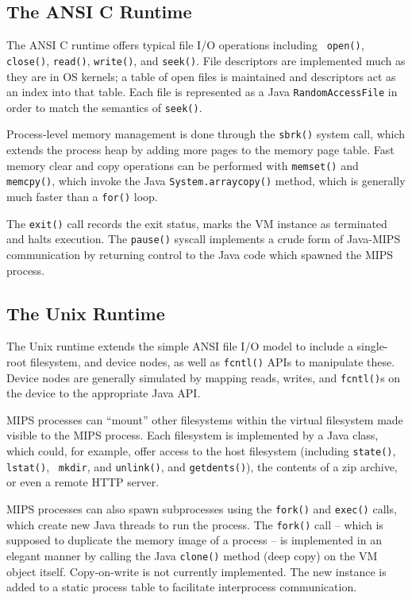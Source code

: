 \documentclass{acmconf}
\begin{document}
\subsection{The ANSI C Runtime}

The ANSI C runtime offers typical file I/O operations including {\tt
open()}, {\tt close()}, {\tt read()}, {\tt write()}, and {\tt seek()}.
File descriptors are implemented much as they are in OS kernels; a
table of open files is maintained and descriptors act as an index into
that table.  Each file is represented as a Java {\tt RandomAccessFile}
in order to match the semantics of {\tt seek()}.

Process-level memory management is done through the {\tt sbrk()}
system call, which extends the process heap by adding more pages to
the memory page table.  Fast memory clear and copy operations can be
performed with {\tt memset()} and {\tt memcpy()}, which invoke the
Java {\tt System.arraycopy()} method, which is generally much faster
than a {\tt for()} loop.

The {\tt exit()} call records the exit status, marks the VM instance
as terminated and halts execution.  The {\tt pause()} syscall
implements a crude form of Java-MIPS communication by returning
control to the Java code which spawned the MIPS process.

\subsection{The Unix Runtime}

The Unix runtime extends the simple ANSI file I/O model to include a
single-root filesystem, and device nodes, as well as {\tt fcntl()}
APIs to manipulate these.  Device nodes are generally simulated by
mapping reads, writes, and {\tt fcntl()}s on the device to the
appropriate Java API.

MIPS processes can ``mount'' other filesystems within the virtual
filesystem made visible to the MIPS process.  Each filesystem is
implemented by a Java class, which could, for example, offer access to
the host filesystem (including {\tt state()}, {\tt lstat()}, {\tt
mkdir}, and {\tt unlink()}, and {\tt getdents()}), the contents of a
zip archive, or even a remote HTTP server.

MIPS processes can also spawn subprocesses using the {\tt fork()} and
{\tt exec()} calls, which create new Java threads to run the process.
The {\tt fork()} call -- which is supposed to duplicate the memory
image of a process -- is implemented in an elegant manner by calling
the Java {\tt clone()} method (deep copy) on the VM object itself.
Copy-on-write is not currently implemented.  The new instance is added
to a static process table to facilitate interprocess communication.
\end{document}

